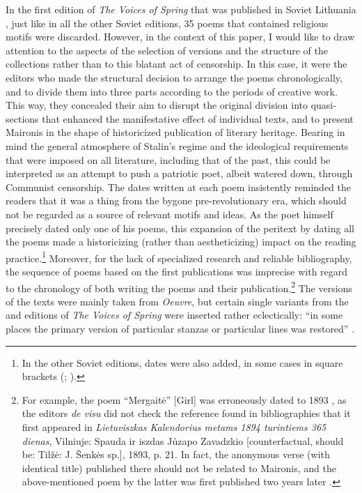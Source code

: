 \begin{paper}
In the first edition of \emph{The Voices of Spring} that was published in Soviet
Lithuania \citep{maironis_pavasario_1947}, just like in all the other Soviet editions,
35 poems that contained religious motifs were discarded. However, in the
context of this paper, I would like to draw attention to the aspects of
the selection of versions and the structure of the collections rather
than to this blatant act of censorship. In this case, it were the editors who made the structural decision to arrange the poems chronologically, and to divide them into three
parts according to the periods of creative work. This way, they concealed their aim to
disrupt the original division into quasi-sections that enhanced the manifestative effect of
individual texts, and to present Maironis in the shape of historicized
publication of literary heritage. Bearing in mind the general atmosphere
of Stalin's regime and the ideological requirements that were imposed on
all literature, including that of the past, this could be interpreted as
an attempt to push a patriotic poet, albeit watered down, through
Communist censorship. The dates written at each poem insistently
reminded the readers that it was a thing from the bygone
pre-revolutionary era, which should not be regarded as a source of
relevant motifs and ideas. As the poet himself precisely dated only one
of his poems, this expansion of the peritext by dating all the poems made a historicizing (rather than
aestheticizing) impact on the reading practice.\footnote{In the other
  Soviet editions, dates were also added, in some cases in square
  brackets (\citealt{maironis_pavasario_1976}; \citealt{maironis_pavasario_1986}).} Moreover, for the lack of
specialized research and reliable bibliography, the sequence of poems
based on the first publications was imprecise with regard to the
chronology of both writing the poems and their publication.\footnote{For
  example, the poem ``Mergaitė'' [Girl] was erroneously dated to
  1893 \citep[21]{maironis_pavasario_1986}, as the editors \emph{de visu} did not check
  the reference found in bibliographies that it first appeared in  \emph{Lietuviszkas Kalendorius metams 1894 turintiems 365
  dienas}, Vilniuje: Spauda ir iszdas Jůzapo Zavadzkio
  {[}counterfactual, should be: Tilžė: J. Šenkės sp.{]}, 1893, p. 21. In
  fact, the anonymous verse (with  identical title) published there
  should not be related to Maironis, and the above-mentioned poem by the
  latter was first published two years later \citep[34--35]{maironis_pavasario_1895}.}
The versions of the texts were mainly taken from \emph{Oeuvre}, but
certain single variants from the \citeyear{maironis_pavasario_1905} and \citeyear{maironis_pavasario_1920} editions of \emph{The
Voices of Spring} were inserted rather eclectically: ``in some places the primary version of particular
stanzas or particular lines was restored'' \citep[222]{maironis_pavasario_1947}.


\end{paper}
